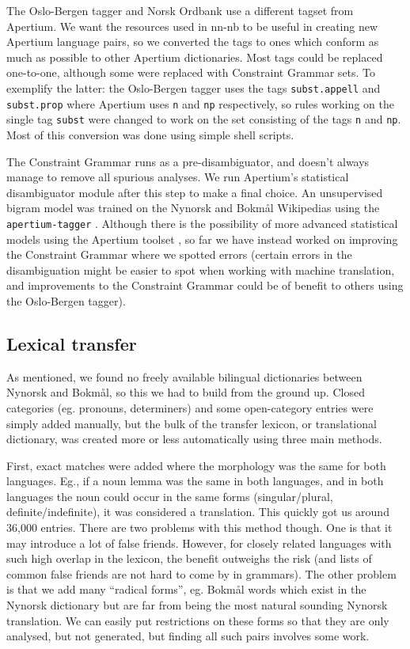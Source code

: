 \documentclass[11pt]{article}
\begin{document}
The Oslo-Bergen tagger and Norsk Ordbank use a different tagset from
Apertium. We want the resources used in nn-nb to be useful in creating
new Apertium language pairs, so we converted the tags to ones which
conform as much as possible to other Apertium dictionaries. Most tags
could be replaced one-to-one, although some were replaced with
Constraint Grammar sets. To exemplify the latter: the Oslo-Bergen
tagger uses the tags {\tt subst.appell} and
{\tt subst.prop} where Apertium uses {\tt n} and
{\tt np} respectively, so rules working on the single tag
{\tt subst} were changed to work on the set consisting of the
tags {\tt n} and {\tt np}. Most of this conversion was done
using simple shell scripts.

The Constraint Grammar runs as a pre-disambiguator, and doesn't always
manage to remove all spurious analyses. We run Apertium's statistical
disambiguator module after this step to make a final choice. An
unsupervised bigram model was trained on the Nynorsk and Bokmål
Wikipedias using the {\tt apertium-tagger} \citep{todo}. Although
there is the possibility of more advanced statistical models using the
Apertium toolset \citep[see~eg.~][]{sanchez2008utl,sheikh2009trigram},
so far we have instead worked on improving the Constraint Grammar
where we spotted errors (certain errors in the disambiguation might be
easier to spot when working with machine translation, and improvements
to the Constraint Grammar could be of benefit to others using the
Oslo-Bergen tagger).

\subsection{Lexical transfer}

As mentioned, we found no freely available bilingual dictionaries
between Nynorsk and Bokmål, so this we had to build from the ground
up. Closed categories (eg. pronouns, determiners) and some
open-category entries were simply added manually, but the bulk of the
transfer lexicon, or translational dictionary, was created more or
less automatically using three main methods.

First, exact matches were added where the morphology was the same for
both languages. Eg., if a noun lemma was the same in both languages,
and in both languages the noun could occur in the same forms
(singular/plural, definite/indefinite), it was considered a
translation. This quickly got us around 36,000 entries. There are two
problems with this method though. One is that it may introduce a lot
of false friends. However, for closely related languages with such
high overlap in the lexicon, the benefit outweighs the risk (and lists
of common false friends are not hard to come by in grammars). The
other problem is that we add many ``radical forms'', eg. Bokmål words
which exist in the Nynorsk dictionary but are far from being the most
natural sounding Nynorsk translation. We can easily put restrictions
on these forms so that they are only analysed, but not generated, but
finding all such pairs involves some work.
\end{document}
